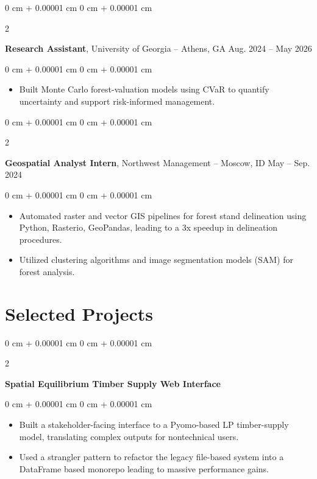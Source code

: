 \documentclass[10pt, letterpaper]{article}
\newenvironment{highlights}{
    \begin{itemize}[
        topsep=0.10 cm,
        parsep=0.10 cm,
        partopsep=0pt,
        itemsep=0pt,
        leftmargin=0 cm + 10pt
    ]
}{
    \end{itemize}
} %
\newenvironment{onecolentry}{
    \begin{adjustwidth}{
        0 cm + 0.00001 cm
    }{
        0 cm + 0.00001 cm
    }
}{
    \end{adjustwidth}
} %
\newenvironment{twocolentry}[2][]{
    \onecolentry
    \def\secondColumn{#2}
    \setcolumnwidth{\fill, 4.5 cm}
    \begin{paracol}{2}
}{
    \switchcolumn \raggedleft \secondColumn
    \end{paracol}
    \endonecolentry
} %
\begin{document}
        \vspace{0.2 cm}
        \begin{twocolentry}{
           Aug. 2024 -- May 2026
        }
            \textbf{Research Assistant}, University of Georgia -- Athens, GA\end{twocolentry}

        \vspace{0.2 cm}
        \begin{onecolentry}
            \begin{highlights}
                \item Built Monte Carlo forest-valuation models using CVaR to quantify uncertainty and support risk-informed management.
            \end{highlights}
        \end{onecolentry}


        \vspace{0.2 cm}

        \begin{twocolentry}{
            May -- Sep. 2024
        }
            \textbf{Geospatial Analyst Intern}, Northwest Management -- Moscow, ID\end{twocolentry}

        \vspace{0.10 cm}
        \begin{onecolentry}
            \begin{highlights}
                \item Automated raster and vector GIS pipelines for forest stand delineation using Python, Rasterio, GeoPandas, leading to a 3x speedup in delineation procedures.
                \item Utilized clustering algorithms and image segmentation models (SAM) for forest analysis.
            \end{highlights}
        \end{onecolentry}


    \section{Selected Projects}
        
        \begin{twocolentry}{
        2026
        }
            \textbf{Spatial Equilibrium Timber Supply Web Interface}\end{twocolentry}

        \vspace{0.10 cm}
        \begin{onecolentry}
            \begin{highlights}
                \item Built a stakeholder-facing interface to a Pyomo-based LP timber-supply model, translating complex outputs for nontechnical users.
                \item Used a strangler pattern to refactor the legacy file-based system into a DataFrame based monorepo leading to massive performance gains.
            \end{highlights}
        \end{onecolentry}
\end{document}
